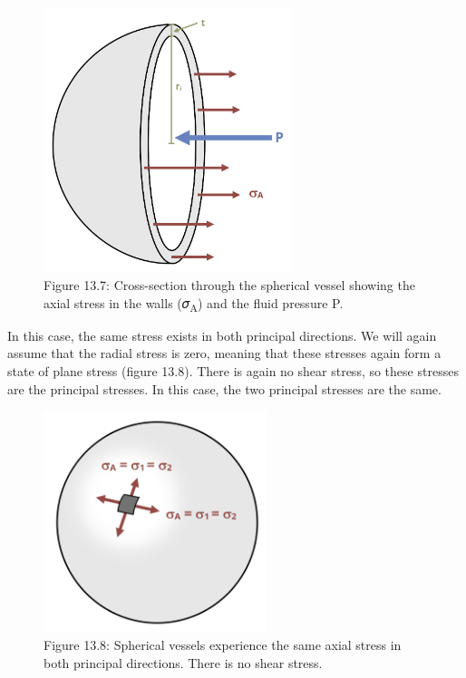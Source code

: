 \documentclass[
  letterpaper,
  DIV=11,
  numbers=noendperiod]{scrreprt}
\theoremstyle{definition}
\theoremstyle{remark}
\begin{document}
\begin{figure}[H]

{\centering \includegraphics[width=2.85417in,height=\textheight]{images/CH13 PNGs/figure 13.7.png}

}

\caption{Figure 13.7: Cross-section through the spherical vessel showing
the axial stress in the walls (𝜎\textsubscript{A}) and the fluid
pressure P.}

\end{figure}%

In this case, the same stress exists in both principal directions. We
will again assume that the radial stress is zero, meaning that these
stresses again form a state of plane stress (figure 13.8). There is
again no shear stress, so these stresses are the principal stresses. In
this case, the two principal stresses are the same.

\begin{figure}[H]

{\centering \includegraphics[width=2.5625in,height=\textheight]{images/CH13 PNGs/figure 13.8.png}

}

\caption{Figure 13.8: Spherical vessels experience the same axial stress
in both principal directions. There is no shear stress.}

\end{figure}%
\end{document}
